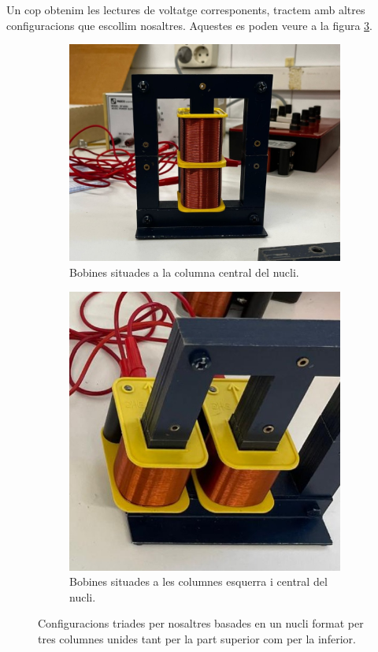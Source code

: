 \documentclass[a4paper,10.5pt]{report}
\begin{document}
Un cop obtenim les lectures de voltatge corresponents, tractem amb altres configuracions que escollim nosaltres. Aquestes es poden veure a la figura \ref{fig4:3}.

\begin{figure}[h]
	\centering
	\begin{subfigure}[b]{0.3\textwidth}
		\centering
		\includegraphics[width=\textwidth]{inv1.jpg}
		\caption{Bobines situades a la columna central del nucli.}
		\label{fig4:3a}
	\end{subfigure}
	\hspace{2cm}
	\begin{subfigure}[b]{0.23\textwidth}
		\centering
		\includegraphics[width=\textwidth]{inv2.jpg}
		\caption{Bobines situades a les columnes esquerra i central del nucli.}
		\label{fig4:3b}
	\end{subfigure}
	\caption{Configuracions triades per nosaltres basades en un nucli format per tres columnes unides tant per la part superior com per la inferior.}
	\label{fig4:3}
\end{figure}
\end{document}
